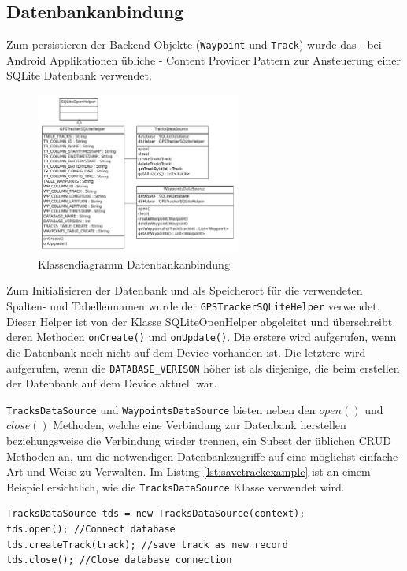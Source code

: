 \subsection{Datenbankanbindung}
\label{subsec:database}
Zum persistieren der Backend Objekte (\lstinline$Waypoint$ und \lstinline$Track$) wurde das - bei Android Applikationen übliche - Content Provider Pattern \cite{contentprovider} zur Ansteuerung einer SQLite Datenbank verwendet. 

\begin{figure}[h]
  \centering
  \includegraphics[width=0.6\textwidth]{images/classdiag_database.pdf}
  \caption[Klassendiagramm Datenbankanbindung]{Klassendiagramm Datenbankanbindung}
  \label{fig:classdiag_database}
\end{figure}

Zum Initialisieren der Datenbank und als Speicherort für die verwendeten Spalten- und Tabellennamen wurde der \lstinline$GPSTrackerSQLiteHelper$ verwendet. Dieser Helper ist von der Klasse SQLiteOpenHelper abgeleitet und überschreibt deren Methoden \lstinline$onCreate()$ und \lstinline$onUpdate()$. Die erstere wird aufgerufen, wenn die Datenbank noch nicht auf dem Device vorhanden ist. Die letztere wird aufgerufen, wenn die \lstinline$DATABASE_VERISON$ höher ist als diejenige, die beim erstellen der Datenbank auf dem Device aktuell war.

\lstinline$TracksDataSource$ und \lstinline$WaypointsDataSource$ bieten neben den $open()$ und $close()$ Methoden, welche eine Verbindung zur Datenbank herstellen beziehungsweise die Verbindung wieder trennen, ein Subset der üblichen CRUD \cite{crud} Methoden an, um die notwendigen Datenbankzugriffe auf eine möglichst einfache Art und Weise zu Verwalten. Im Listing \ref{lst:savetrackexample} ist an einem Beispiel ersichtlich, wie die \lstinline$TracksDataSource$ Klasse verwendet wird.

\begin{lstlisting}[caption={Beispiel: Track speichern}, label={lst:savetrackexample}]
TracksDataSource tds = new TracksDataSource(context);
tds.open(); //Connect database
tds.createTrack(track); //save track as new record 
tds.close(); //Close database connection
\end{lstlisting}

